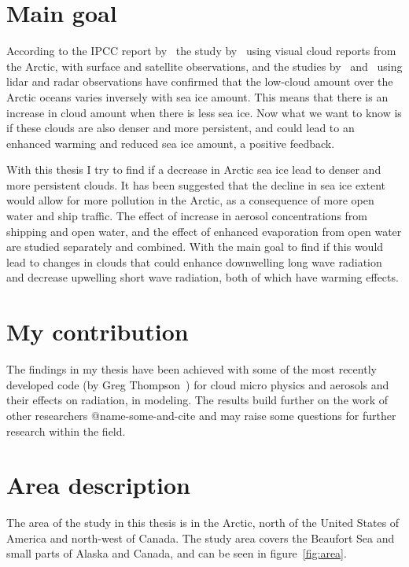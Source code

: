 \section{Main goal}
According to the IPCC report by~\citet{Boucher2013} the study by~\citet{Eastman2010b} using visual cloud reports from the Arctic, with surface and satellite observations, and the studies by~\citet{Kay2009} and~\citet{Palm2010} using lidar and radar observations have confirmed that the low-cloud amount over the Arctic oceans varies inversely with sea ice amount. This means that there is an increase in cloud amount when there is less sea ice. Now what we want to know is if these clouds are also denser and more persistent, and could lead to an enhanced warming and reduced sea ice amount, a positive feedback.

With this thesis I try to find if a decrease in Arctic sea ice lead to denser and more persistent clouds. It has been suggested that the decline in sea ice extent would allow for more pollution in the Arctic, as a consequence of more open water and ship traffic. The effect of increase in aerosol concentrations from shipping and open water, and the effect of enhanced evaporation from open water are studied separately and combined. With the main goal to find if this would lead to changes in clouds that could enhance downwelling long wave radiation and decrease upwelling short wave radiation, both of which have warming effects.


\section{My contribution}%
The findings in my thesis have been achieved with some of the most recently developed code (by Greg Thompson~\citep{Thompson2014}) for cloud micro physics and aerosols and their effects on radiation, in modeling. The results build further on the work of other researchers @name-some-and-cite and may raise some questions for further research within the field.

\section{Area description}
The area of the study in this thesis is in the Arctic, north of the United States of America and north-west of Canada. The study area covers the Beaufort Sea and small parts of Alaska and Canada, and can be seen in figure~\ref{fig:area}.

